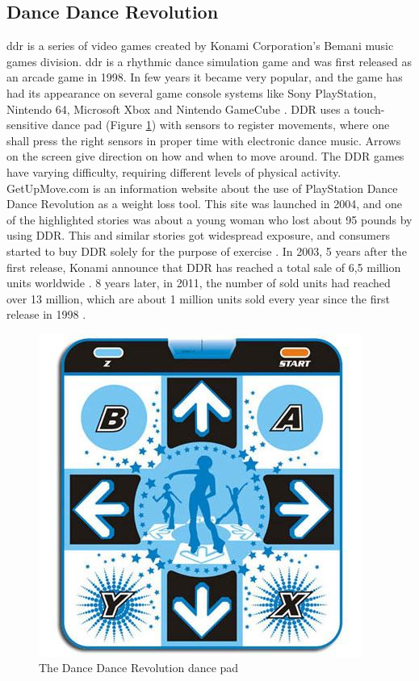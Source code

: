 \subsection{Dance Dance Revolution}
\ac{ddr} is a series of video games created by Konami Corporation’s Bemani music games division. \ac{ddr} is a rhythmic dance simulation game and was first released as an arcade game in 1998. In few years it became very popular, and the game has had its appearance on several game console systems like Sony PlayStation, Nintendo 64, Microsoft Xbox and Nintendo GameCube \cite{bogost2005rhetoric}. DDR uses a touch-sensitive dance pad (Figure \ref{fig:DDRPad}) with sensors to register movements, where one shall press the right sensors in proper time with electronic dance music. Arrows on the screen give direction on how and when to move around. The DDR games have varying difficulty, requiring different levels of physical activity. GetUpMove.com is an information website about the use of PlayStation Dance Dance Revolution as a weight loss tool. This site was launched in 2004, and one of the highlighted stories was about a young woman who lost about 95 pounds by using DDR. This and similar stories got widespread exposure, and consumers started to buy DDR solely for the purpose of exercise \cite{bogost2005rhetoric}. In 2003, 5 years after the first release, Konami announce that DDR has reached a total sale of 6,5 million units worldwide \cite{gamespot}. 8 years later, in 2011, the number of sold units had reached over 13 million, which are about 1 million units sold every year since the first release in 1998 \cite{gaygamer}. 
\begin{figure}[h!]
\begin{center}
\includegraphics[scale=0.5]{ddrpad}
\caption[Dance Dance Revolution]{The Dance Dance Revolution dance pad}
\label{fig:DDRPad}
\end{center}
\end{figure}

